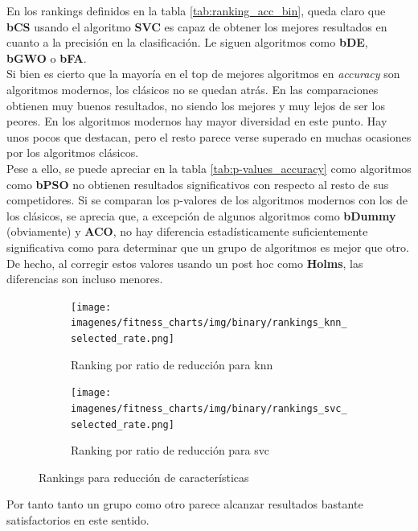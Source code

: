 En los rankings definidos en la tabla \ref{tab:ranking_acc_bin}, queda claro que \textbf{bCS} usando el algoritmo \textbf{SVC} es capaz de obtener los mejores resultados en cuanto a la precisión en la clasificación. Le siguen algoritmos como \textbf{bDE}, \textbf{bGWO} o \textbf{bFA}.\\[6pt]

Si bien es cierto que la mayoría en el top de mejores algoritmos en \textit{accuracy} son algoritmos modernos, los clásicos no se quedan atrás. En las comparaciones obtienen muy buenos resultados, no siendo los mejores y muy lejos de ser los peores. En los algoritmos modernos hay mayor diversidad en este punto. Hay unos pocos que destacan, pero el resto parece verse superado en muchas ocasiones por los algoritmos clásicos.\\[6pt]

Pese a ello, se puede apreciar en la tabla \ref{tab:p-values_accuracy} como algoritmos como \textbf{bPSO} no obtienen resultados significativos con respecto al resto de sus competidores. Si se comparan los p-valores de los algoritmos modernos con los de los clásicos, se aprecia que, a excepción de algunos algoritmos como \textbf{bDummy} (obviamente) y \textbf{ACO}, no hay diferencia estadísticamente suficientemente significativa como para determinar que un grupo de algoritmos es mejor que otro. De hecho, al corregir estos valores usando un post hoc como \textbf{Holms}, las diferencias son incluso menores.\\[6pt]

\begin{figure}[htp]
    \centering
    \begin{subfigure}[htp]{1\textwidth}
        \texttt{[image: imagenes/fitness\_charts/img/binary/rankings\_knn\_selected\_rate.png]}
        \caption{Ranking por ratio de reducción para knn}
        \label{fig:ranking_knn_red}
    \end{subfigure}
    \begin{subfigure}[htp]{1\textwidth}
        \texttt{[image: imagenes/fitness\_charts/img/binary/rankings\_svc\_selected\_rate.png]}
        \caption{Ranking por ratio de reducción para svc}
        \label{fig:ranking_svc_red}
    \end{subfigure}
    \caption{Rankings para reducción de características}
    \label{fig:rankings_red}
\end{figure}

Por tanto tanto un grupo como otro parece alcanzar resultados bastante satisfactorios en este sentido.

